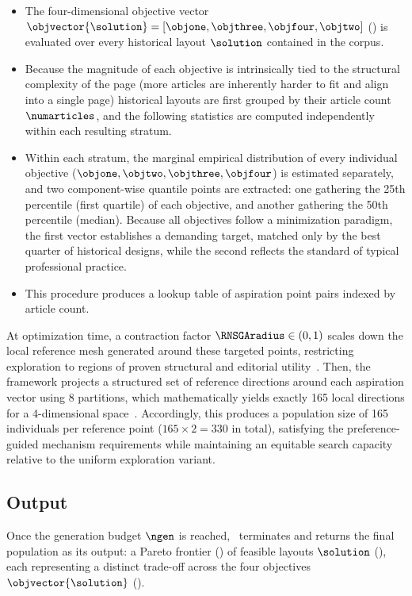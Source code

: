 \begin{itemize}
    \item The four-dimensional objective vector $\objvector{\solution} = [\objone, \objthree, \objfour, \objtwo]$ () is evaluated over every historical layout $\solution$ contained in the corpus.
    \item Because the  magnitude of each objective is intrinsically tied to the structural complexity of the page (more articles are inherently harder to fit and align into a single page) historical layouts are first grouped by their article count $\numarticles$, and the following statistics are computed independently within each resulting stratum.
    \item Within each stratum, the marginal empirical distribution of every individual objective ($\objone, \objtwo, \objthree, \objfour$) is estimated separately, and two component-wise quantile points are extracted: one gathering the 25th percentile (first quartile) of each objective, and another gathering the 50th percentile (median). Because all objectives follow a minimization paradigm, the first vector establishes a demanding target, matched only by the best quarter of historical designs, while the second reflects the standard of typical professional practice.
    \item This procedure produces a lookup table of aspiration point pairs indexed by article count.
\end{itemize}
At optimization time, a contraction factor $\RNSGAradius \in (0,1)$ scales down the local reference mesh generated around these targeted points, restricting exploration to regions of proven structural and editorial utility~\cite{rnsga-iii}. Then, the framework projects a structured set of reference directions around each aspiration vector using 8 partitions, which mathematically yields exactly 165 local directions for a 4-dimensional space~\cite{rnsga-iii}. Accordingly, this produces a population size of 165 individuals per reference point ($165 \times 2 = 330$ in total), satisfying the preference-guided mechanism requirements while maintaining an equitable search capacity relative to the uniform exploration variant.

\subsection{Output}

Once the generation budget $\ngen$ is reached, \methodNameGeneral\ terminates and returns the final population as its output: a Pareto frontier () of feasible layouts $\solution$ (), each representing a distinct trade-off across the four objectives $\objvector{\solution}$ ().
